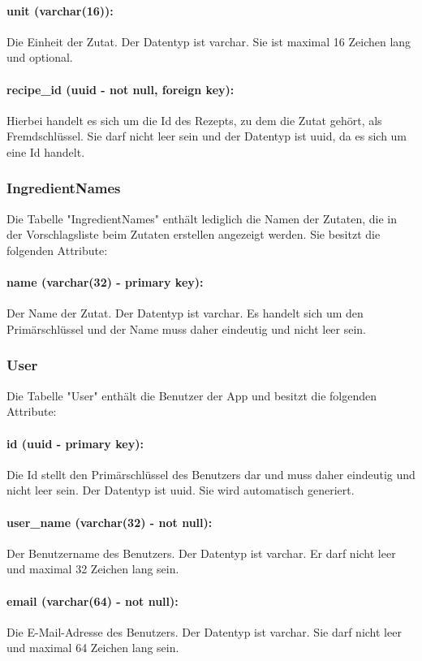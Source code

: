 \documentclass[parskip=full]{scrartcl}
\begin{document}
\paragraph{unit (varchar(16)):} Die Einheit der Zutat. Der Datentyp ist \Gls{varchar}. Sie ist maximal 16 Zeichen lang und optional. 
\paragraph{recipe\_id (uuid - not null, foreign key):} Hierbei handelt es sich um die Id des Rezepts, zu dem die Zutat gehört, als Fremdschlüssel. Sie darf nicht leer sein und der Datentyp ist \Gls{uuid}, da es sich um eine Id handelt.
\newpage
\subsubsection{IngredientNames}
Die Tabelle "IngredientNames" enthält lediglich die Namen der Zutaten, die in der Vorschlagsliste beim Zutaten erstellen angezeigt werden. Sie besitzt die folgenden Attribute:
\paragraph{name (varchar(32) - primary key):} Der Name der Zutat. Der Datentyp ist \Gls{varchar}. Es handelt sich um den Primärschlüssel und der Name muss daher eindeutig und nicht leer sein.
\newpage
\subsubsection{User}
Die Tabelle "User" enthält die Benutzer der App und besitzt die folgenden Attribute:
\paragraph{id (uuid - primary key):} Die Id stellt den Primärschlüssel des Benutzers dar und muss daher eindeutig und nicht leer sein. Der Datentyp ist \Gls{uuid}. Sie wird automatisch generiert.
\paragraph{user\_name (varchar(32) - not null):} Der Benutzername des Benutzers. Der Datentyp ist \Gls{varchar}. Er darf nicht leer und maximal 32 Zeichen lang sein.
\paragraph{email (varchar(64) - not null):} Die E-Mail-Adresse des Benutzers. Der Datentyp ist \Gls{varchar}. Sie darf nicht leer und maximal 64 Zeichen lang sein.
\end{document}
